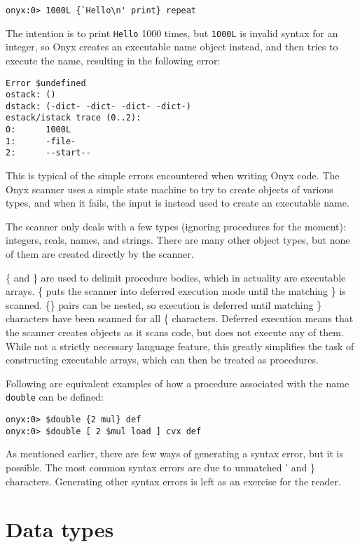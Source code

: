 \begin{verbatim}
onyx:0> 1000L {`Hello\n' print} repeat
\end{verbatim}

The intention is to print {\tt Hello} 1000 times, but {\tt 1000L} is invalid
syntax for an integer, so Onyx creates an executable name object instead, and
then tries to execute the name, resulting in the following error:

\begin{verbatim}
Error $undefined
ostack: ()
dstack: (-dict- -dict- -dict- -dict-)
estack/istack trace (0..2):
0:      1000L
1:      -file-
2:      --start--
\end{verbatim}

This is typical of the simple errors encountered when writing Onyx code.  The
Onyx scanner uses a simple state machine to try to create objects of various
types, and when it fails, the input is instead used to create an executable
name.

The scanner only deals with a few types (ignoring procedures for the moment):
integers, reals, names, and strings.  There are many other object types, but
none of them are created directly by the scanner.

\{ and \} are used to delimit procedure bodies, which in actuality are
executable arrays.  \{ puts the scanner into deferred execution mode until the
matching \} is scanned.  \{\} pairs can be nested, so execution is deferred
until matching \} characters have been scanned for all \{ characters.  Deferred
execution means that the scanner creates objects as it scans code, but does not
execute any of them.  While not a strictly necessary language feature, this
greatly simplifies the task of constructing executable arrays, which can then be
treated as procedures.

Following are equivalent examples of how a procedure associated with the name
{\tt double} can be defined:

\begin{verbatim}
onyx:0> $double {2 mul} def
onyx:0> $double [ 2 $mul load ] cvx def
\end{verbatim}

As mentioned earlier, there are few ways of generating a syntax error, but it is
possible.  The most common syntax errors are due to unmatched ' and \}
characters.  Generating other syntax errors is left as an exercise for the
reader.

\section{Data types}

